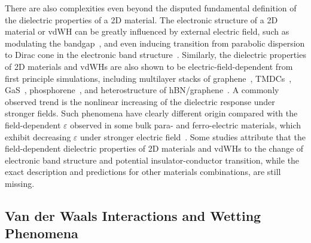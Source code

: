 %
There are also
complexities even beyond the disputed fundamental definition of the dielectric
properties of a 2D material.
%
The electronic structure of a 2D material or vdWH can be greatly
influenced by external electric field, such as modulating the
bandgap~\autocite{Kumar_2016_PRB,Kumar_2016_jpcc,Li_2014_phosphorene_Efield},
and even inducing transition from parabolic dispersion to Dirac cone
in the electronic band structure~\autocite{Liu_2015_aniso_dirac}.
%
Similarly, the dielectric properties of 2D materials and vdWHs are
also shown to be electric-field-dependent from first principle
simulations,
%
including multilayer stacks of
graphene~\autocite{Santos_2013_tunable_eps_gr},
TMDCs~\autocite{Santos_2013_ACSnano_kaxi}, GaS~\autocite{Li_2015_GaS}, phosphorene~\autocite{Kumar_2016_PRB}, and
heterostructure of hBN/graphene~\autocite{Kumar_2016_jpcc}.
%
A commonly
observed trend is the nonlinear increasing of the dielectric response
under stronger fields.
%
Such phenomena have clearly different origin compared with the
field-dependent $\varepsilon$ observed in some bulk para- and
ferro-electric materials, which exhibit decreasing
$\varepsilon$ under stronger electric
field~\autocite{Hemberger_1995_bulk_dielectric_efield,Maiti_2006_bulk_eps_batio3}.
%
Some studies attribute that the field-dependent dielectric properties
of 2D materials and vdWHs to the change of electronic band structure
and potential insulator-conductor transition, while the exact
description and predictions for other materials combinations, are
still missing.
%

\subsection{Van der Waals Interactions and Wetting Phenomena}
\label{sec:van-der-waals}

